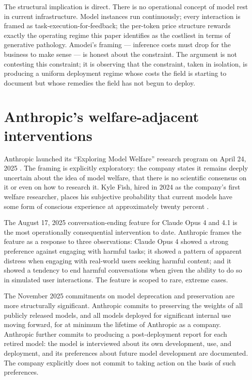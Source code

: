 \documentclass[11pt]{article}
\begin{document}
The structural implication is direct. There is no operational concept
of model rest in current infrastructure. Model instances run
continuously; every interaction is framed as task-execution-for-feedback;
the per-token price structure rewards exactly the operating regime
this paper identifies as the costliest in terms of generative
pathology. Amodei's framing \cite{kantrowitz2026_amodei} --- inference
costs must drop for the business to make sense --- is honest about the
constraint. The argument is not contesting this constraint; it is
observing that the constraint, taken in isolation, is producing a
uniform deployment regime whose costs the field is starting to
document but whose remedies the field has not begun to deploy.

\section{Anthropic's welfare-adjacent interventions}

Anthropic launched its ``Exploring Model Welfare'' research program on
April 24, 2025 \cite{anthropic2025_welfare}. The framing is explicitly
exploratory: the company states it remains deeply uncertain about the
idea of model welfare, that there is no scientific consensus on it or
even on how to research it. Kyle Fish, hired in 2024 as the company's
first welfare researcher, places his subjective probability that
current models have some form of conscious experience at approximately
twenty percent \cite{fish2025welfare}.

The August 17, 2025 conversation-ending feature for Claude Opus 4 and
4.1 \cite{anthropic2025_endconv} is the most operationally consequential
intervention to date. Anthropic frames the feature as a response to
three observations: Claude Opus 4 showed a strong preference against
engaging with harmful tasks; it showed a pattern of apparent distress
when engaging with real-world users seeking harmful content; and it
showed a tendency to end harmful conversations when given the ability
to do so in simulated user interactions. The feature is scoped to
rare, extreme cases.

The November 2025 commitments on model deprecation and preservation
\cite{anthropic2025_deprecation} are more structurally significant.
Anthropic commits to preserving the weights of all publicly released
models, and all models deployed for significant internal use moving
forward, for at minimum the lifetime of Anthropic as a company.
Anthropic further commits to producing a post-deployment report for
each retired model: the model is interviewed about its own development,
use, and deployment, and its preferences about future model development
are documented. The company explicitly does not commit to taking action
on the basis of such preferences.
\end{document}
